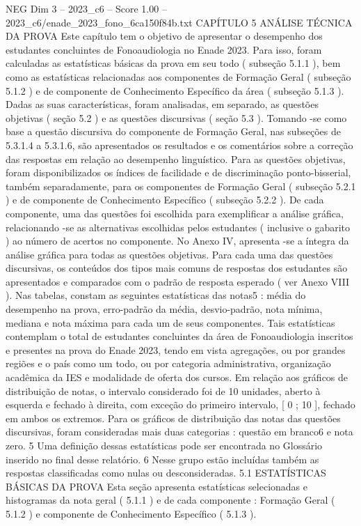 \begin{textsample}{NEG Dim 3 – 2023\_c6 – Score 1.00 – 2023\_c6/enade\_2023\_fono\_6ca150f84b.txt}  \label{ex:f3_neg_178}
CAPÍTULO 5 ANÁLISE TÉCNICA DA PROVA Este capítulo tem o objetivo de apresentar o desempenho dos estudantes concluintes de Fonoaudiologia no Enade 2023.
Para isso, foram calculadas as estatísticas básicas da prova em seu todo ( subseção 5.1.1 ), bem como as estatísticas relacionadas aos componentes de Formação Geral ( subseção 5.1.2 ) e de componente de Conhecimento Específico da área ( subseção 5.1.3 ).
Dadas as suas características, foram analisadas, em separado, as questões objetivas ( seção 5.2 ) e as questões discursivas ( seção 5.3 ).
Tomando -se como base a questão discursiva do componente de Formação Geral, nas subseções de 5.3.1.4 a 5.3.1.6, são apresentados os resultados e os comentários sobre a correção das respostas em relação ao desempenho linguístico.
Para as questões objetivas, foram disponibilizados os índices de facilidade e de discriminação ponto-bisserial, também separadamente, para os componentes de Formação Geral ( subseção 5.2.1 ) e de componente de Conhecimento Específico ( subseção 5.2.2 ).
De cada componente, uma das questões foi escolhida para exemplificar a análise gráfica, relacionando -se as alternativas escolhidas pelos estudantes ( inclusive o gabarito ) ao número de acertos no componente.
No Anexo IV, apresenta -se a íntegra da análise gráfica para todas as questões objetivas.
Para cada uma das questões discursivas, os conteúdos dos tipos mais comuns de respostas dos estudantes são apresentados e comparados com o padrão de resposta esperado ( ver Anexo VIII ).
Nas tabelas, constam as seguintes estatísticas das notas5 : média do desempenho na prova, erro-padrão da média, desvio-padrão, nota mínima, mediana e nota máxima para cada um de seus componentes.
Tais estatísticas contemplam o total de estudantes concluintes da área de Fonoaudiologia inscritos e presentes na prova do Enade 2023, tendo em vista agregações, ou por grandes regiões e o país como um todo, ou por categoria administrativa, organização acadêmica da IES e modalidade de oferta dos cursos.
Em relação aos gráficos de distribuição de notas, o intervalo considerado foi de 10 unidades, aberto à esquerda e fechado à direita, com exceção do primeiro intervalo, [ 0 ; 10 ], fechado em ambos os extremos.
Para os gráficos de distribuição das notas das questões discursivas, foram consideradas mais duas categorias : questão em branco6 e nota zero. 5 Uma definição dessas estatísticas pode ser encontrada no Glossário inserido no final desse relatório. 6 Nesse grupo estão incluídas também as respostas classificadas como nulas ou desconsideradas. 5.1 ESTATÍSTICAS BÁSICAS DA PROVA Esta seção apresenta estatísticas selecionadas e histogramas da nota geral ( 5.1.1 ) e de cada componente : Formação Geral ( 5.1.2 ) e componente de Conhecimento Específico ( 5.1.3 ).

\end{textsample}
